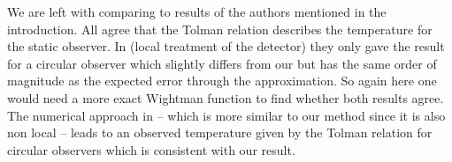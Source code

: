 We are left with comparing to results of the authors mentioned in the introduction. All agree that the Tolman relation describes the temperature for the static observer. In \cite{smerlak} (local treatment of the detector) they only gave the result for a circular observer which slightly differs from our but has the same order of magnitude as the expected error through the approximation. So again here one would need a more exact Wightman function to find whether both results agree. The numerical approach in \cite{Hodgkinson}  -- which is more similar to our method since it is also non local -- leads to an observed temperature given by the Tolman relation for circular observers which is consistent with our result.    

  